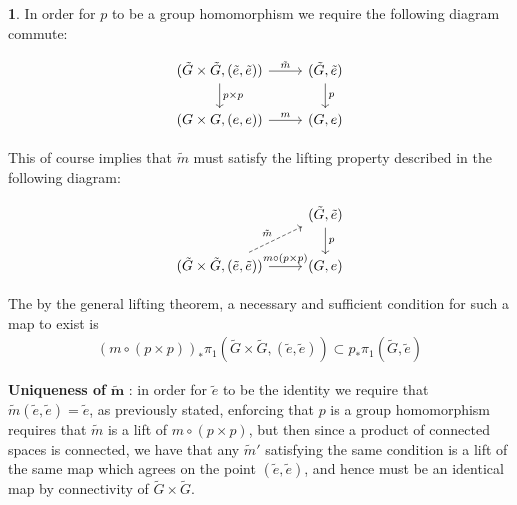 \documentclass[10.5pt]{article}
\theoremstyle{definition}
\newtheorem{pb}{}
\begin{document}
    \newpage
    \begin{pb}
        In order for \(p\) to be a group homomorphism we require the following diagram commute:

        \begin{equation*} 
            \begin{tikzcd}
                (\tilde{G} \times \tilde{G},(\tilde{e},\tilde{e}))\arrow[r, "\tilde{m}"] \arrow[d, "p \times p"]& (\tilde{G},\tilde{e})\arrow[d, "p"]\\
                (G\times G, (e,e))\arrow[r, "m"]& (G,e)
            \end{tikzcd}
        \end{equation*}

        This of course implies that \(\tilde{m}\) must satisfy the lifting property described in the following diagram:

        \begin{equation*}
            \begin{tikzcd}
                &(\tilde{G},\tilde{e})\ar[d, "p"]\\
                (\tilde{G} \times \tilde{G},(\tilde{e},\tilde{e}))\ar[r, "m\circ (p \times p)"]\ar[ru, "\tilde{m}", dashed]&(G,e)
                \end{tikzcd}
        \end{equation*}

        The by the general lifting theorem, a necessary and sufficient condition for such a map to exist is
        \begin{align*}
            (m\circ(p\times p))_*\pi_1(\tilde{G}\times\tilde{G},(\tilde{e},\tilde{e})) \subset p_* \pi_1(\tilde{G},\tilde{e})
        \end{align*}

        \textbf{Uniqueness of} \(\mathbf{\tilde{m}}\) :
        in order for \(\tilde{e}\) to be the identity we require that \(\tilde{m}(\tilde{e},\tilde{e}) = \tilde{e}\), as previously stated, enforcing that \(p\) is a group homomorphism requires that \(\tilde{m}\) is a lift of \(m \circ (p \times p)\), but then since a product of connected spaces is connected, we have that any \(\tilde{m}'\) satisfying the same condition is a lift of the same map which agrees on the point \((\tilde{e},\tilde{e})\), and hence must be an identical map by connectivity of \(\tilde{G}\times \tilde{G}\).


\end{pb}
\end{document}
